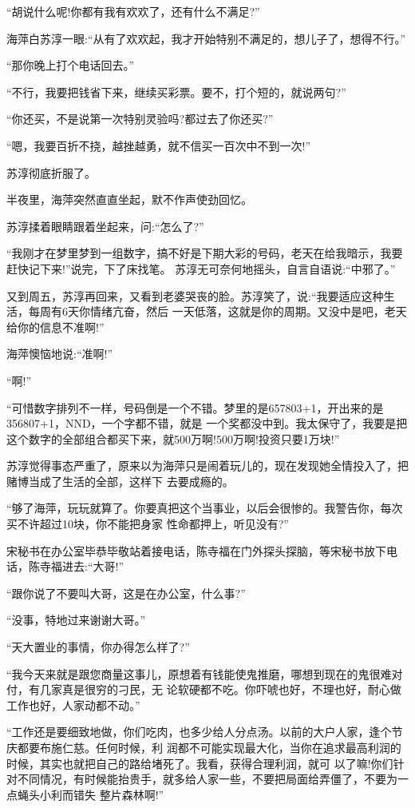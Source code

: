 \documentclass[11pt,a4paper,onecolumn]{article}
\begin{document}
``胡说什么呢!你都有我有欢欢了，还有什么不满足?''

海萍白苏淳一眼:``从有了欢欢起，我才开始特别不满足的，想儿子了，想得不行。''

``那你晚上打个电话回去。''

``不行，我要把钱省下来，继续买彩票。要不，打个短的，就说两句?''

``你还买，不是说第一次特别灵验吗?都过去了你还买?''

``嗯，我要百折不挠，越挫越勇，就不信买一百次中不到一次!''

苏淳彻底折服了。

半夜里，海萍突然直直坐起，默不作声使劲回忆。

苏淳揉着眼睛跟着坐起来，问:``怎么了?''

``我刚才在梦里梦到一组数字，搞不好是下期大彩的号码，老天在给我暗示，我要赶快记下来!''说完，下了床找笔。
苏淳无可奈何地摇头，自言自语说:``中邪了。''

又到周五，苏淳再回来，又看到老婆哭丧的脸。苏淳笑了，说:``我要适应这种生活，每周有6天你情绪亢奋，然后
一天低落，这就是你的周期。又没中是吧，老天给你的信息不准啊!''

海萍懊恼地说:``准啊!''

``啊!''

``可惜数字排列不一样，号码倒是一个不错。梦里的是657803+1，开出来的是356807+1，NND，一个字都不错，就是
一个奖都没中到。我太保守了，我要是把这个数字的全部组合都买下来，就500万啊!500万啊!投资只要1万块!''

苏淳觉得事态严重了，原来以为海萍只是闹着玩儿的，现在发现她全情投入了，把赌博当成了生活的全部，这样下
去要成瘾的。

``够了海萍，玩玩就算了。你要真把这个当事业，以后会很惨的。我警告你，每次买不许超过10块，你不能把身家
性命都押上，听见没有?''

宋秘书在办公室毕恭毕敬站着接电话，陈寺福在门外探头探脑，等宋秘书放下电话，陈寺福进去:``大哥!''

``跟你说了不要叫大哥，这是在办公室，什么事?''

``没事，特地过来谢谢大哥。''

``天大置业的事情，你办得怎么样了?''

``我今天来就是跟您商量这事儿，原想着有钱能使鬼推磨，哪想到现在的鬼很难对付，有几家真是很穷的刁民，无
论软硬都不吃。你吓唬也好，不理也好，耐心做工作也好，人家动都不动。''

``工作还是要细致地做，你们吃肉，也多少给人分点汤。以前的大户人家，逢个节庆都要布施仁慈。任何时候，利
润都不可能实现最大化，当你在追求最高利润的时候，其实也就把自己的路给堵死了。我看，获得合理利润，就可
以了嘛!你们针对不同情况，有时候能抬贵手，就多给人家一些，不要把局面给弄僵了，不要为一点蝇头小利而错失
整片森林啊!''
\end{document}
